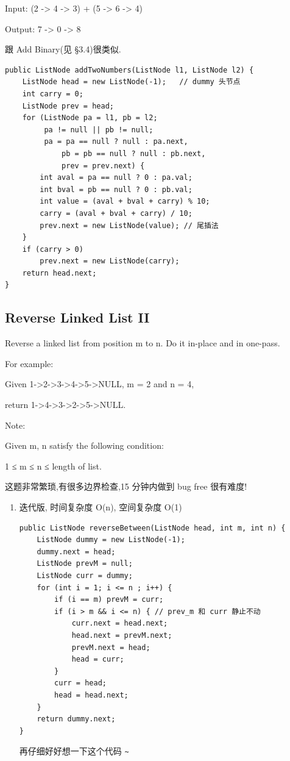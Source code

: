 \documentclass[12pt]{book}
\begin{document}
Input: (2 -> 4 -> 3) + (5 -> 6 -> 4)

Output: 7 -> 0 -> 8

跟 Add Binary(见 §3.4)很类似. 

\lstset{language=java,label= ,caption= ,numbers=none}
\begin{lstlisting}
public ListNode addTwoNumbers(ListNode l1, ListNode l2) {
    ListNode head = new ListNode(-1);   // dummy 头节点
    int carry = 0;
    ListNode prev = head;
    for (ListNode pa = l1, pb = l2;
         pa != null || pb != null;
         pa = pa == null ? null : pa.next,
             pb = pb == null ? null : pb.next,
             prev = prev.next) {
        int aval = pa == null ? 0 : pa.val;
        int bval = pb == null ? 0 : pb.val;
        int value = (aval + bval + carry) % 10;
        carry = (aval + bval + carry) / 10;
        prev.next = new ListNode(value); // 尾插法
    }
    if (carry > 0)
        prev.next = new ListNode(carry);
    return head.next;
}
\end{lstlisting}

\subsection{Reverse Linked List II}
\label{sec-3-2-2}

Reverse a linked list from position m to n. Do it in-place and in one-pass.

For example:

Given 1->2->3->4->5->NULL, m = 2 and n = 4,

return 1->4->3->2->5->NULL.

Note:

Given m, n satisfy the following condition:

1 ≤ m ≤ n ≤ length of list.

这题非常繁琐,有很多边界检查,15 分钟内做到 bug free 很有难度!

\begin{enumerate}
\item 迭代版, 时间复杂度 O(n), 空间复杂度 O(1)
\label{sec-3-2-2-1}

\lstset{language=java,label= ,caption= ,numbers=none}
\begin{lstlisting}
public ListNode reverseBetween(ListNode head, int m, int n) {
    ListNode dummy = new ListNode(-1);
    dummy.next = head;
    ListNode prevM = null;
    ListNode curr = dummy;
    for (int i = 1; i <= n ; i++) {
        if (i == m) prevM = curr;
        if (i > m && i <= n) { // prev_m 和 curr 静止不动
            curr.next = head.next;
            head.next = prevM.next;
            prevM.next = head;
            head = curr;
        }
        curr = head;
        head = head.next;
    }
    return dummy.next;
}
\end{lstlisting}

再仔细好好想一下这个代码 \verb,~,
\end{enumerate}
\end{document}
